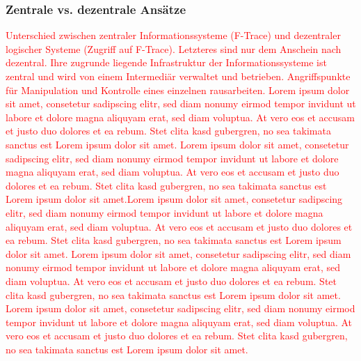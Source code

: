 \subsubsection{Zentrale vs. dezentrale Ansätze}
\textcolor{red}{Unterschied zwischen zentraler Informationssysteme (F-Trace) und dezentraler logischer Systeme (Zugriff auf F-Trace). Letzteres sind nur dem Anschein nach dezentral. Ihre zugrunde liegende Infrastruktur der Informationssysteme ist zentral und wird von einem Intermediär verwaltet und betrieben. Angriffspunkte für Manipulation und Kontrolle eines einzelnen rausarbeiten. \citep{Steins2015, allgemeinefleischerzeitung2011}
Lorem ipsum dolor sit amet, consetetur sadipscing elitr, sed diam nonumy eirmod tempor invidunt ut labore et dolore magna aliquyam erat, sed diam voluptua. At vero eos et accusam et justo duo dolores et ea rebum. Stet clita kasd gubergren, no sea takimata sanctus est Lorem ipsum dolor sit amet. Lorem ipsum dolor sit amet, consetetur sadipscing elitr, sed diam nonumy eirmod tempor invidunt ut labore et dolore magna aliquyam erat, sed diam voluptua. At vero eos et accusam et justo duo dolores et ea rebum. Stet clita kasd gubergren, no sea takimata sanctus est Lorem ipsum dolor sit amet.Lorem ipsum dolor sit amet, consetetur sadipscing elitr, sed diam nonumy eirmod tempor invidunt ut labore et dolore magna aliquyam erat, sed diam voluptua. At vero eos et accusam et justo duo dolores et ea rebum. Stet clita kasd gubergren, no sea takimata sanctus est Lorem ipsum dolor sit amet. Lorem ipsum dolor sit amet, consetetur sadipscing elitr, sed diam nonumy eirmod tempor invidunt ut labore et dolore magna aliquyam erat, sed diam voluptua. At vero eos et accusam et justo duo dolores et ea rebum. Stet clita kasd gubergren, no sea takimata sanctus est Lorem ipsum dolor sit amet. Lorem ipsum dolor sit amet, consetetur sadipscing elitr, sed diam nonumy eirmod tempor invidunt ut labore et dolore magna aliquyam erat, sed diam voluptua. At vero eos et accusam et justo duo dolores et ea rebum. Stet clita kasd gubergren, no sea takimata sanctus est Lorem ipsum dolor sit amet.}

